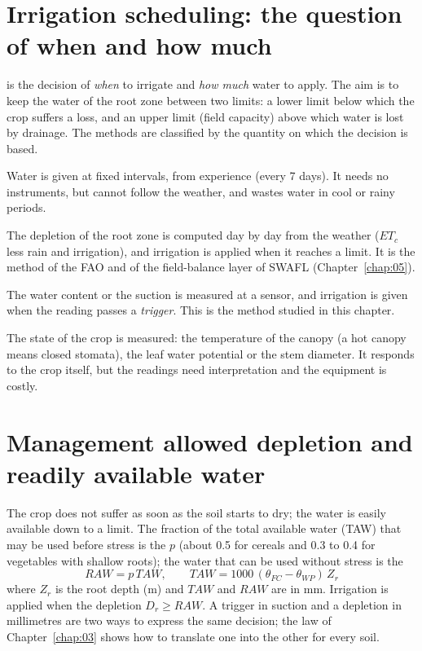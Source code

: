 \section{Irrigation scheduling: the question of when and how much}
 is the decision of \emph{when} to irrigate and \emph{how much} water to apply. The aim is to keep the water of the root zone between two limits: a lower limit below which the crop suffers a loss, and an upper limit (field capacity) above which water is lost by drainage. The methods are classified by the quantity on which the decision is based.
\begin{exlist}
\item {} Water is given at fixed intervals, from experience (every 7 days). It needs no instruments, but cannot follow the weather, and wastes water in cool or rainy periods.
\item {} The depletion of the root zone is computed day by day from the weather ($ET_c$ less rain and irrigation), and irrigation is applied when it reaches a limit. It is the method of the FAO and of the field-balance layer of SWAFL (Chapter~\ref{chap:05}).
\item {} The water content or the suction is measured at a sensor, and irrigation is given when the reading passes a \emph{trigger}. This is the method studied in this chapter.
\item {} The state of the crop is measured: the temperature of the canopy (a hot canopy means closed stomata), the leaf water potential or the stem diameter. It responds to the crop itself, but the readings need interpretation and the equipment is costly.
\end{exlist}

\section{Management allowed depletion and readily available water}
The crop does not suffer as soon as the soil starts to dry; the water is easily available down to a limit. The fraction of the total available water (TAW) that may be used before stress is the  $p$ (about 0.5 for cereals and 0.3 to 0.4 for vegetables with shallow roots); the water that can be used without stress is the 
\begin{equation*}\boxed{RAW=p\,TAW,\qquad TAW=1000\,(\theta_{FC}-\theta_{WP})\,Z_r}\end{equation*}
where $Z_r$ is the root depth (m) and $TAW$ and $RAW$ are in mm. Irrigation is applied when the depletion $D_r\ge RAW$. A trigger in suction and a depletion in millimetres are two ways to express the same decision; the law of Chapter~\ref{chap:03} shows how to translate one into the other for every soil.

